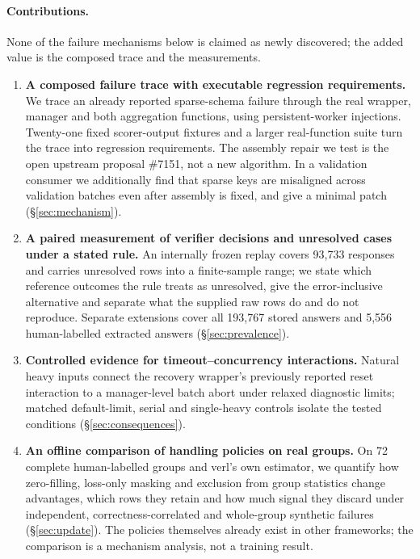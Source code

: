 \documentclass[10pt,a4paper]{article}
\begin{document}
\paragraph{Contributions.}
None of the failure mechanisms below is claimed as newly discovered; the
added value is the composed trace and the measurements.
\begin{enumerate}[nosep,leftmargin=*]
\item \textbf{A composed failure trace with executable regression requirements.}
  We trace an already reported sparse-schema failure through the real
  wrapper, manager and both aggregation functions, using persistent-worker
  injections. Twenty-one fixed scorer-output fixtures and a larger
  real-function suite turn the trace into regression requirements. The
  assembly repair we test is the open upstream proposal \#7151, not a new
  algorithm. In a validation consumer we additionally find that sparse keys
  are misaligned across validation batches even after assembly is fixed,
  and give a minimal patch (\S\ref{sec:mechanism}).
\item \textbf{A paired measurement of verifier decisions and unresolved
  cases under a stated rule.} An internally frozen replay covers 93,733
  responses and carries unresolved rows into a finite-sample range; we state
  which reference outcomes the rule treats as unresolved, give the
  error-inclusive alternative and separate what the supplied raw rows do and
  do not reproduce. Separate extensions cover all 193,767 stored answers and
  5,556 human-labelled extracted answers (\S\ref{sec:prevalence}).
\item \textbf{Controlled evidence for timeout--concurrency interactions.}
  Natural heavy inputs connect the recovery wrapper's previously reported
  reset interaction to a manager-level batch abort under relaxed diagnostic
  limits; matched default-limit, serial and single-heavy controls isolate
  the tested conditions (\S\ref{sec:consequences}).
\item \textbf{An offline comparison of handling policies on real groups.}
  On 72 complete human-labelled groups and verl's own estimator, we quantify
  how zero-filling, loss-only masking and exclusion from group statistics
  change advantages, which rows they retain and how much signal they discard
  under independent, correctness-correlated and whole-group synthetic
  failures (\S\ref{sec:update}). The policies
  themselves already exist in other frameworks; the comparison is a
  mechanism analysis, not a training result.
\end{enumerate}
\end{document}
